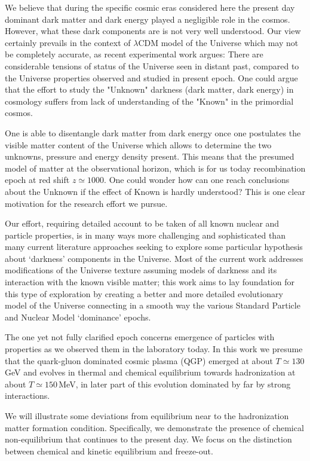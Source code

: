  We believe that during the specific cosmic eras considered here the present day dominant dark matter and dark energy played a negligible role in the cosmos. However, what these dark components are is not very well understood. Our view certainly prevails in the context of $\lambda$CDM model of the Universe which may not be completely accurate, as recent experimental work argues: There are considerable tensions of status of the Universe seen in distant past, compared to the Universe properties observed and studied in present epoch.  One could argue that the effort to study the "Unknown" darkness (dark matter, dark energy) in cosmology suffers from lack of understanding of the "Known" in the primordial cosmos.

One is able to disentangle dark matter from dark energy once one postulates the visible matter content of the Universe which allows to determine the two unknowns, pressure and energy density present.  This means that the presumed model of matter at the observational horizon, which is for us today recombination epoch at red shift $z\simeq 1000$.  One could wonder how can one reach conclusions about the Unknown if the effect of Known is hardly understood? This is one clear motivation for the research effort we pursue. 

Our effort, requiring detailed account to be taken of all known nuclear and particle properties, is in many ways more challenging and sophisticated than many current literature  approaches seeking to explore some particular hypothesis about  `darkness' components  in the Universe. Most of the current work addresses modifications of the Universe texture assuming models of darkness and its interaction with the known visible matter; this work aims to lay foundation for this type of exploration by creating a better and more detailed evolutionary model of the Universe connecting in a smooth way the various   Standard Particle and Nuclear Model `dominance' epochs. 

The one yet not fully clarified epoch concerns emergence of particles with  properties as we observed them in the laboratory today. In this work we presume  that the quark-gluon dominated cosmic plasma (QGP) emerged at about $T\simeq 130$\,GeV and evolves in thermal and chemical equilibrium towards hadronization at about $T\simeq150$\,MeV, in later part of this evolution dominated by far by strong interactions. 

We will illustrate some deviations from equilibrium  near to the hadronization  matter formation condition. Specifically,  we demonstrate the presence of chemical non-equilibrium that continues to the present day. We focus on the distinction between chemical and kinetic equilibrium and freeze-out.

